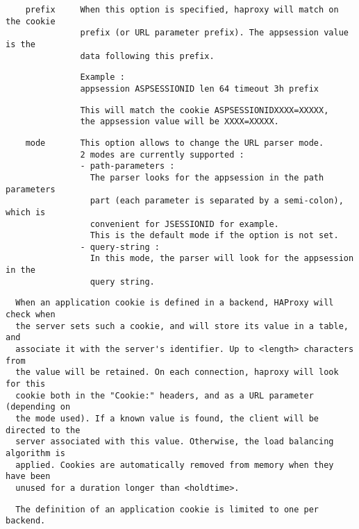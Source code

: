 \begin{verbatim}
    prefix     When this option is specified, haproxy will match on the cookie
               prefix (or URL parameter prefix). The appsession value is the
               data following this prefix.
\end{verbatim}

\begin{verbatim}
               Example :
               appsession ASPSESSIONID len 64 timeout 3h prefix
\end{verbatim}

\begin{verbatim}
               This will match the cookie ASPSESSIONIDXXXX=XXXXX,
               the appsession value will be XXXX=XXXXX.
\end{verbatim}

\begin{verbatim}
    mode       This option allows to change the URL parser mode.
               2 modes are currently supported :
               - path-parameters :
                 The parser looks for the appsession in the path parameters
                 part (each parameter is separated by a semi-colon), which is
                 convenient for JSESSIONID for example.
                 This is the default mode if the option is not set.
               - query-string :
                 In this mode, the parser will look for the appsession in the
                 query string.
\end{verbatim}

\begin{verbatim}
  When an application cookie is defined in a backend, HAProxy will check when
  the server sets such a cookie, and will store its value in a table, and
  associate it with the server's identifier. Up to <length> characters from
  the value will be retained. On each connection, haproxy will look for this
  cookie both in the "Cookie:" headers, and as a URL parameter (depending on
  the mode used). If a known value is found, the client will be directed to the
  server associated with this value. Otherwise, the load balancing algorithm is
  applied. Cookies are automatically removed from memory when they have been
  unused for a duration longer than <holdtime>.
\end{verbatim}

\begin{verbatim}
  The definition of an application cookie is limited to one per backend.
\end{verbatim}

